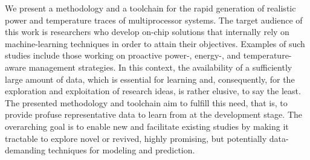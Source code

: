 We present a methodology and a toolchain for the rapid generation of realistic
power and temperature traces of multiprocessor systems. The target audience of
this work is researchers who develop on-chip solutions that internally rely on
machine-learning techniques in order to attain their objectives. Examples of
such studies include those working on proactive power-, energy-, and
temperature-aware management strategies. In this context, the availability of a
sufficiently large amount of data, which is essential for learning and,
consequently, for the exploration and exploitation of research ideas, is rather
elusive, to say the least. The presented methodology and toolchain aim to
fulfill this need, that is, to provide profuse representative data to learn from
at the development stage. The overarching goal is to enable new and facilitate
existing studies by making it tractable to explore novel or revived, highly
promising, but potentially data-demanding techniques for modeling and
prediction.
